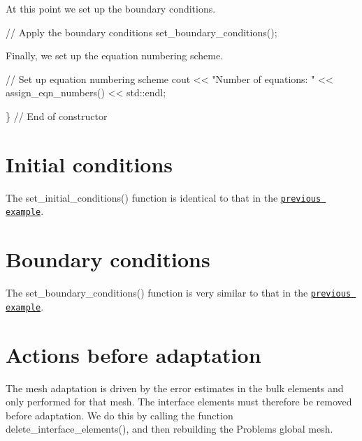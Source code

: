 At this point we set up the boundary conditions.


\begin{DoxyCodeInclude}
 \textcolor{comment}{// Apply the boundary conditions}
 set\_boundary\_conditions();

\end{DoxyCodeInclude}


Finally, we set up the equation numbering scheme.


\begin{DoxyCodeInclude}
 \textcolor{comment}{// Set up equation numbering scheme}
 cout << \textcolor{stringliteral}{"Number of equations: "} << assign\_eqn\_numbers() << std::endl;

\} \textcolor{comment}{// End of constructor}

\end{DoxyCodeInclude}




 

\hypertarget{index_set_initial_condition}{}\section{Initial conditions}\label{index_set_initial_condition}
The {\ttfamily set\+\_\+initial\+\_\+conditions()} function is identical to that in the \href{../../single_layer_free_surface/html/index.html#set_initial_condition}{\tt previous example}.



 

\hypertarget{index_set_boundary_conditions}{}\section{Boundary conditions}\label{index_set_boundary_conditions}
The {\ttfamily set\+\_\+boundary\+\_\+conditions()} function is very similar to that in the \href{../../single_layer_free_surface/html/index.html#set_boundary_conditions}{\tt previous example}.



 

\hypertarget{index_before_adapt}{}\section{Actions before adaptation}\label{index_before_adapt}
The mesh adaptation is driven by the error estimates in the bulk elements and only performed for that mesh. The interface elements must therefore be removed before adaptation. We do this by calling the function {\ttfamily delete\+\_\+interface\+\_\+elements()}, and then rebuilding the {\ttfamily Problem\textquotesingle{}s} global mesh.


